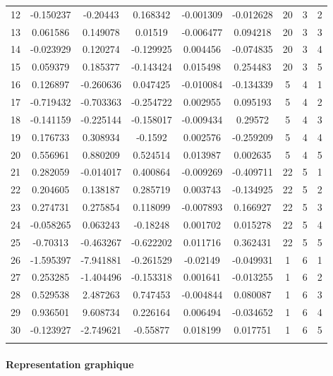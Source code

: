 \documentclass[11pt,]{article}
\let\oldparagraph\paragraph
\renewcommand{\paragraph}[1]{\oldparagraph{#1}\mbox{}}
\begin{document}
\begin{table}[!htbp]
\begin{tabular}{@{\extracolsep{5pt}} ccccccccc}
12 & -0.150237 & -0.20443 & 0.168342 & -0.001309 & -0.012628 & 20 & 3 & 2 \\ 
13 & 0.061586 & 0.149078 & 0.01519 & -0.006477 & 0.094218 & 20 & 3 & 3 \\ 
14 & -0.023929 & 0.120274 & -0.129925 & 0.004456 & -0.074835 & 20 & 3 & 4 \\ 
15 & 0.059379 & 0.185377 & -0.143424 & 0.015498 & 0.254483 & 20 & 3 & 5 \\ 
16 & 0.126897 & -0.260636 & 0.047425 & -0.010084 & -0.134339 & 5 & 4 & 1 \\ 
17 & -0.719432 & -0.703363 & -0.254722 & 0.002955 & 0.095193 & 5 & 4 & 2 \\ 
18 & -0.141159 & -0.225144 & -0.158017 & -0.009434 & 0.29572 & 5 & 4 & 3 \\ 
19 & 0.176733 & 0.308934 & -0.1592 & 0.002576 & -0.259209 & 5 & 4 & 4 \\ 
20 & 0.556961 & 0.880209 & 0.524514 & 0.013987 & 0.002635 & 5 & 4 & 5 \\ 
21 & 0.282059 & -0.014017 & 0.400864 & -0.009269 & -0.409711 & 22 & 5 & 1 \\ 
22 & 0.204605 & 0.138187 & 0.285719 & 0.003743 & -0.134925 & 22 & 5 & 2 \\ 
23 & 0.274731 & 0.275854 & 0.118099 & -0.007893 & 0.166927 & 22 & 5 & 3 \\ 
24 & -0.058265 & 0.063243 & -0.18248 & 0.001702 & 0.015278 & 22 & 5 & 4 \\ 
25 & -0.70313 & -0.463267 & -0.622202 & 0.011716 & 0.362431 & 22 & 5 & 5 \\ 
26 & -1.595397 & -7.941881 & -0.261529 & -0.02149 & -0.049931 & 1 & 6 & 1 \\ 
27 & 0.253285 & -1.404496 & -0.153318 & 0.001641 & -0.013255 & 1 & 6 & 2 \\ 
28 & 0.529538 & 2.487263 & 0.747453 & -0.004844 & 0.080087 & 1 & 6 & 3 \\ 
29 & 0.936501 & 9.608734 & 0.226164 & 0.006494 & -0.034652 & 1 & 6 & 4 \\ 
30 & -0.123927 & -2.749621 & -0.55877 & 0.018199 & 0.017751 & 1 & 6 & 5 \\ 
\hline \\[-1.8ex] 
\end{tabular} 
\end{table}

\FloatBarrier

\hypertarget{representation-graphique}{%
\paragraph{Representation graphique}\label{representation-graphique}}
\end{document}
